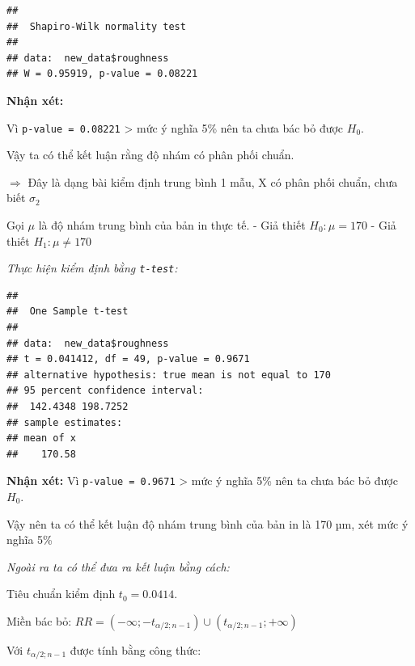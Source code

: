 \begin{verbatim}
## 
##  Shapiro-Wilk normality test
## 
## data:  new_data$roughness
## W = 0.95919, p-value = 0.08221
\end{verbatim}

\textbf{Nhận xét: }

Vì \texttt{p-value\ =\ 0.08221} \textgreater{} mức ý nghĩa 5\% nên ta
chưa bác bỏ được \(H_0\).

Vậy ta có thể kết luận rằng độ nhám có phân phối chuẩn.

\(\Rightarrow\) Đây là dạng bài kiểm định trung bình 1 mẫu, X có phân phối chuẩn, chưa
biết \(\sigma_2\)

Gọi \(\mu\) là độ nhám trung bình của bản in thực tế. - Giả thiết
\(H_0: \mu = 170\) - Giả thiết \(H_1: \mu \neq 170\)

\emph{Thực hiện kiểm định bằng \texttt{t-test}:}

\begin{Shaded}
\begin{Highlighting}[]
\SpecialCharTok{$} \NormalTok{)}
\end{Highlighting}
\end{Shaded}

\begin{verbatim}
## 
##  One Sample t-test
## 
## data:  new_data$roughness
## t = 0.041412, df = 49, p-value = 0.9671
## alternative hypothesis: true mean is not equal to 170
## 95 percent confidence interval:
##  142.4348 198.7252
## sample estimates:
## mean of x 
##    170.58
\end{verbatim}

\textbf{Nhận xét:} Vì \texttt{p-value\ =\ 0.9671} \textgreater{} mức ý
nghĩa 5\% nên ta chưa bác bỏ được \(H_0\).

Vậy nên ta có thể kết luận độ nhám trung bình của bản in là 170 µm, xét
mức ý nghĩa 5\%

\emph{Ngoài ra ta có thể đưa ra kết luận bằng cách:}

Tiêu chuẩn kiểm định \(t_0 = 0.0414\).

Miền bác bỏ:
\(RR = (-\infty; -t_{\alpha/2; n-1}) \cup (t_{\alpha/2; n-1}; +\infty)\)

Với \(t_{\alpha/2; n-1}\) được tính bằng công thức:

\begin{Shaded}
\begin{Highlighting}[]
\NormalTok{(} \SpecialCharTok{/}\NormalTok{, } \SpecialCharTok{{-}}\NormalTok{, } \NormalTok{)}
\end{Highlighting}
\end{Shaded}

